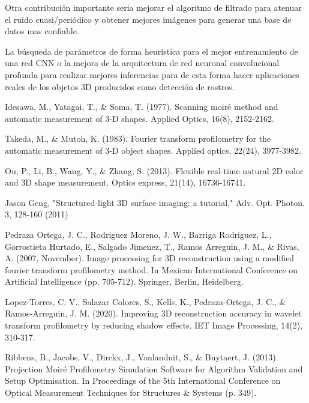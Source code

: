 \documentclass[10pt,letterpaper]{article}
\begin{document}

Otra contribución importante seria mejorar el algoritmo de filtrado para atenuar el ruido cuasi/periódico y obtener mejores imágenes para generar una base de datos mas confiable.

La búsqueda de parámetros de forma heuristica para el mejor entrenamiento de una red CNN o la mejora de la arquitectura de red neuronal convolucional profunda para realizar mejores inferencias para de esta forma hacer aplicaciones reales de los objetos 3D producidos como detección de rostros.
\newpage
\begin{thebibliography}{0}

Idesawa, M., Yatagai, T., \& Soma, T. (1977). Scanning moiré method and automatic measurement of 3-D shapes. Applied Optics, 16(8), 2152-2162.

Takeda, M., \& Mutoh, K. (1983). Fourier transform profilometry for the automatic measurement of 3-D object shapes. Applied optics, 22(24), 3977-3982.

Ou, P., Li, B., Wang, Y., \& Zhang, S. (2013). Flexible real-time natural 2D color and 3D shape measurement. Optics express, 21(14), 16736-16741.

Jason Geng, "Structured-light 3D surface imaging: a tutorial," Adv. Opt. Photon. 3, 128-160 (2011)

Pedraza Ortega, J. C., Rodriguez Moreno, J. W., Barriga Rodriguez, L., Gorrostieta Hurtado, E., Salgado Jimenez, T., Ramos Arreguin, J. M., \& Rivas, A. (2007, November). Image processing for 3D reconstruction using a modified fourier transform profilometry method. In Mexican International Conference on Artificial Intelligence (pp. 705-712). Springer, Berlin, Heidelberg.

Lopez‐Torres, C. V., Salazar Colores, S., Kells, K., Pedraza‐Ortega, J. C., \& Ramos‐Arreguin, J. M. (2020). Improving 3D reconstruction accuracy in wavelet transform profilometry by reducing shadow effects. IET Image Processing, 14(2), 310-317.

Ribbens, B., Jacobs, V., Dirckx, J., Vanlanduit, S., \& Buytaert, J. (2013). Projection Moiré Profilometry Simulation Software for Algorithm Validation and Setup Optimisation. In Proceedings of the 5th International Conference on Optical Measurement Techniques for Structures \& Systems (p. 349).


\end{thebibliography}
\end{document}
